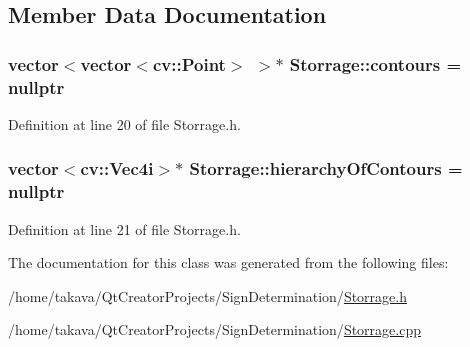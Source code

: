 \subsection{Member Data Documentation}
\hypertarget{class_storrage_a383c9368b9070a2e80ae546b2b403840}{
\subsubsection[{contours}]{\setlength{\rightskip}{0pt plus 5cm}vector$<$vector$<$cv\+::\+Point$>$ $>$$\ast$ Storrage\+::contours = nullptr\hspace{0.3cm}{\ttfamily [private]}}}\label{class_storrage_a383c9368b9070a2e80ae546b2b403840}


Definition at line 20 of file Storrage.\+h.

\hypertarget{class_storrage_a07627c89e8ac2b17b05039ffae257511}{
\subsubsection[{hierarchy\+Of\+Contours}]{\setlength{\rightskip}{0pt plus 5cm}vector$<$cv\+::\+Vec4i$>$$\ast$ Storrage\+::hierarchy\+Of\+Contours = nullptr\hspace{0.3cm}{\ttfamily [private]}}}\label{class_storrage_a07627c89e8ac2b17b05039ffae257511}


Definition at line 21 of file Storrage.\+h.



The documentation for this class was generated from the following files\+:\begin{DoxyCompactItemize}
\item 
/home/takava/\+Qt\+Creator\+Projects/\+Sign\+Determination/\hyperlink{_storrage_8h}{Storrage.\+h}\item 
/home/takava/\+Qt\+Creator\+Projects/\+Sign\+Determination/\hyperlink{_storrage_8cpp}{Storrage.\+cpp}\end{DoxyCompactItemize}
